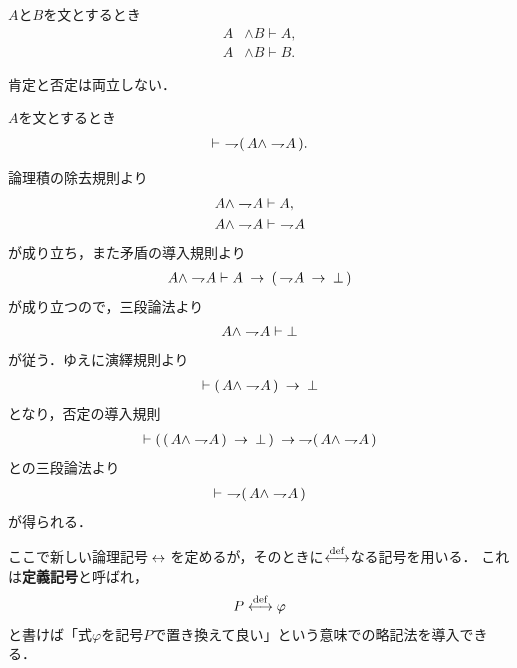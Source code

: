 	\begin{screen}
		\begin{logicalaxm}[論理積の除去]
		\label{logicalaxm:elimination_of_conjunction}
			$A$と$B$を文とするとき
			\begin{align}
				A &\wedge B \vdash A, \\
				A &\wedge B \vdash B.
			\end{align}
		\end{logicalaxm}
	\end{screen}
	
	肯定と否定は両立しない．
	
	\begin{screen}
		\begin{logicalthm}[無矛盾律]
		\label{logicalthm:law_of_noncontradiction}
			$A$を文とするとき
			\begin{align}
				\vdash\ \rightharpoondown\hspace{-0.25em} (\, A \wedge \rightharpoondown\hspace{-0.25em} A\, ).
			\end{align}
		\end{logicalthm}
	\end{screen}
	
	\begin{prf}
		論理積の除去規則より
		\begin{align}
			A \wedge \rightharpoondown\hspace{-0.25em} A &\vdash A, \\
			A \wedge \rightharpoondown\hspace{-0.25em} A &\vdash\ \rightharpoondown\hspace{-0.25em} A
		\end{align}
		が成り立ち，また矛盾の導入規則より
		\begin{align}
			A \wedge \rightharpoondown\hspace{-0.25em} A \vdash A \hspace{0.25em}\rightarrow\hspace{0.25em} (\, \rightharpoondown\hspace{-0.25em} A \hspace{0.25em}\rightarrow\hspace{0.25em} \bot\, )
		\end{align}
		が成り立つので，三段論法より
		\begin{align}
			A \wedge \rightharpoondown\hspace{-0.25em} A \vdash \bot
		\end{align}
		が従う．ゆえに演繹規則より
		\begin{align}
			\vdash (\, A \wedge \rightharpoondown\hspace{-0.25em} A\, ) \hspace{0.25em}\rightarrow\hspace{0.25em} \bot
		\end{align}
		となり，否定の導入規則
		\begin{align}
			\vdash (\, (\, A \wedge \rightharpoondown\hspace{-0.25em} A\, ) \hspace{0.25em}\rightarrow\hspace{0.25em} \bot\, )
			\hspace{0.25em}\rightarrow\hspace{0.25em} \rightharpoondown\hspace{-0.25em} (\, A \wedge \rightharpoondown\hspace{-0.25em} A\, )
		\end{align}
		との三段論法より
		\begin{align}
			\vdash\ \rightharpoondown\hspace{-0.25em} (\, A \wedge \rightharpoondown\hspace{-0.25em} A\, )
		\end{align}
		が得られる．
		\QED
	\end{prf}
	
	ここで新しい論理記号$\hspace{0.25em}\leftrightarrow\hspace{0.25em}$を定めるが，そのときに$\overset{\mathrm{def}}{\longleftrightarrow}$なる記号を用いる．
	これは{\bf 定義記号}と呼ばれ，
	\begin{align}
		P \overset{\mathrm{def}}{\longleftrightarrow} \varphi
		\label{fom:defining_arrow}
	\end{align}
	と書けば「式$\varphi$を記号$P$で置き換えて良い」という意味での略記法を導入できる．
	
